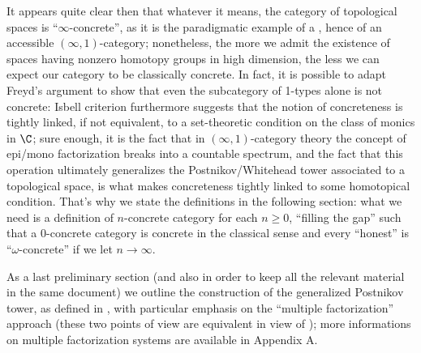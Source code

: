 \documentclass[12pt]{amsart}
\begin{document}
It appears quite clear then that whatever it means, the category of topological spaces is ``$\infty$-concrete'', as it is the paradigmatic example of a \inftop, hence of an accessible $(\infty,1)$-category; nonetheless, the more we admit the existence of spaces having nonzero homotopy groups in high dimension, the less we can expect our category to be classically concrete. In fact, it is possible to adapt Freyd's argument to show that even the subcategory of 1-types alone is not concrete:
Isbell criterion furthermore suggests that the notion of concreteness is tightly linked, if not equivalent, to a set-theoretic condition on the class of monics in $\C$; sure enough, it is the fact that in $(\infty,1)$-category theory the concept of epi/mono factorization breaks into a countable spectrum, and the fact that this operation ultimately generalizes the Postnikov/Whitehead tower associated to a topological space, is what makes concreteness tightly linked to some homotopical condition. That's why we state the definitions in the following section: what we need is a definition of $n$-concrete category for each $n\ge 0$, ``filling the gap'' such that a 0-concrete category is concrete in the classical sense and every ``honest'' \inftop is ``$\omega$-concrete'' if we let $n\to \infty$.
\begin{figure}
\centering
{}
\caption{}
\end{figure}
As a last preliminary section (and also in order to keep all the relevant material in the same document) we outline the construction of the generalized Postnikov tower, as defined in \cite[???]{HTT}, with particular emphasis on the ``multiple factorization'' approach (these two points of view are equivalent in view of \cite{RT}); more informations on multiple factorization systems are available in Appendix A.
\end{document}
